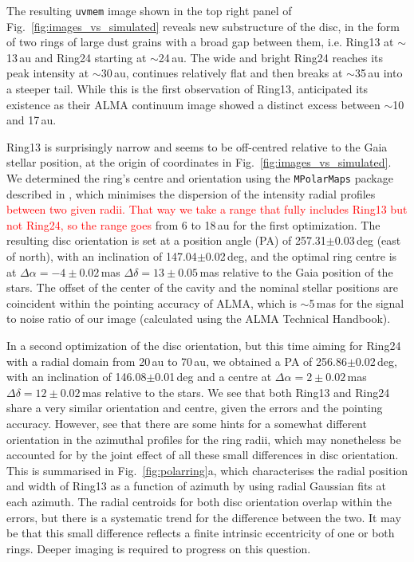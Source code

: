 \documentclass[fleqn,usenatbib,useAMS]{mnras}
\newcommand{\red}[1]{\textcolor{red}{#1}}
\begin{document}
The resulting {\tt uvmem} image shown in the top right panel of Fig.~\ref{fig:images_vs_simulated} reveals new substructure of the disc, in the form of two rings of large dust grains with a broad gap between them, i.e. Ring13 at $\sim$13\,au and Ring24 starting at $\sim$24\,au. The wide and bright Ring24 reaches its peak intensity at $\sim$30\,au, continues relatively flat and then breaks at $\sim$35\,au into a steeper tail. While this is the first observation of Ring13, \citet{Ru_z_Rodr_guez_2019} anticipated its existence as their ALMA continuum image showed a distinct excess between $\sim$10 and 17\,au.

Ring13 is surprisingly narrow and seems to be off-centred relative to the Gaia stellar position, at the origin of coordinates in Fig.~\ref{fig:images_vs_simulated}. We determined the ring's centre and orientation using the {\tt MPolarMaps} package described in \citep{2021arXiv210408379C}, which minimises the dispersion of the intensity radial profiles \red{between two given radii. That way we take a range that fully includes Ring13 but not Ring24, so the range goes} from 6 to 18\,au for the first optimization. The resulting disc orientation is set at a position angle (PA) of 257.31$\pm$0.03\,deg (east of north), with an inclination of 147.04$\pm$0.02\,deg, and the optimal ring centre is at $\Delta \alpha = -4\pm0.02$\,mas $\Delta \delta = 13\pm0.05$\,mas relative to the Gaia position of the stars. The offset of the center of the cavity and the nominal stellar positions are coincident within the pointing accuracy of ALMA, which  is $\sim$5\,mas for the signal to noise ratio of our image (calculated using the ALMA Technical Handbook).

In a second optimization of the disc orientation, but this time aiming for Ring24 with a radial domain from 20\,au to 70\,au, we obtained a PA of 256.86$\pm$0.02\,deg, with an inclination of 146.08$\pm$0.01\,deg and a centre at $\Delta \alpha = 2\pm0.02$\,mas $\Delta \delta = 12\pm0.02$\,mas relative to the stars. We see that both Ring13 and Ring24 share a very similar orientation and centre, given the errors and the pointing accuracy. However, see that there are some hints for a somewhat different orientation in the azimuthal profiles for the ring radii, which may nonetheless be accounted for by the joint effect of all these small differences in disc orientation. This is summarised in Fig.~\ref{fig:polarring}a, which characterises the radial position and width of Ring13 as a function of azimuth by using radial Gaussian fits at each azimuth. The radial centroids for both disc orientation overlap within the errors, but there is a systematic trend for the difference between the two. It may be that this small difference reflects a finite  intrinsic eccentricity of one or both rings. Deeper imaging is required to progress on this question.
\end{document}
